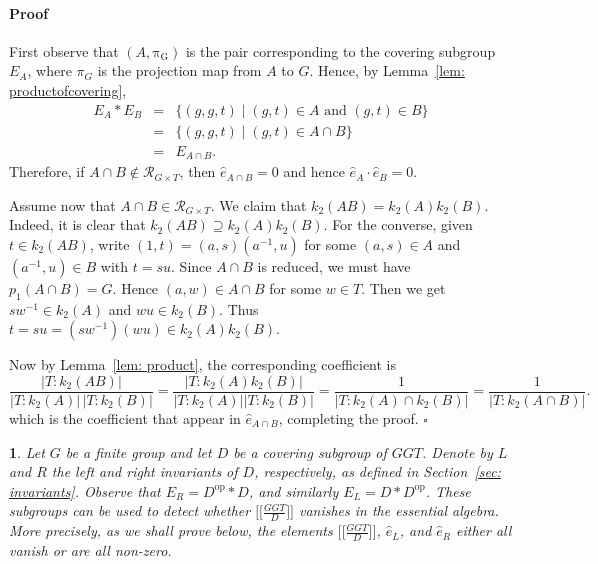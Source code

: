 \documentclass[12pt]{article}
\theoremstyle{change}
\newtheorem{nothing}[theorem]{}
\newenvironment{proof}{\paragraph{Proof}}{\hfill$\square$}
\newcommand{\calR}{\mathcal{R}}
\newcommand{\1}{{\bf 1}}
\begin{document}
\begin{proof}
First observe that \((A,\mathrm{\pi_G})\) is the pair corresponding to the covering subgroup \(E_A\), where $\pi_G$ is the projection map from $A$ to $G$. Hence, by Lemma~\ref{lem: productofcovering},
\begin{eqnarray*}
E_A*E_B
&=&
\{(g,g,t)\mid (g,t)\in A \text{ and } (g,t)\in B\} \\
&=&
\{(g,g,t)\mid (g,t)\in A\cap B\} \\
&=&
E_{A\cap B}.
\end{eqnarray*}
Therefore, if \(A\cap B \notin \calR_{G\times T}\), then
\(
\widehat{e}_{A\cap B}=0
\)
and hence
\(
\widehat{e}_A\cdot \widehat{e}_B=0.
\)

Assume now that \(A\cap B \in \calR_{G\times T}\). We claim that $k_2(AB) = k_2(A)k_2(B)$. Indeed, it is clear that $k_2(AB) \supseteq k_2(A)k_2(B)$. For the converse, given $t\in k_2(AB)$, write $(1, t) = (a, s)(a^{-1}, u)$ for some $(a, s)\in A$ and $(a^{-1}, u)\in B$ with $t= su$. Since $A\cap B$ is reduced, we must have $p_1(A\cap B) = G$. Hence $(a, w)\in A\cap B$ for some $w\in T$. Then we get $sw^{-1}\in k_2(A)$ and $wu\in k_2(B)$. Thus $t = su = (sw^{-1})(wu)\in k_2(A)k_2(B)$.

Now by Lemma~\ref{lem: product}, the corresponding coefficient is
$$
\frac{|T : k_2(AB)|}{|T : k_2(A)|\,|T : k_2(B)|} = \frac{|T:k_2(A)k_2(B)|}{|T:k_2(A)||T:k_2(B)|} = 
\frac{1}{|T:k_2(A)\cap k_2(B)|} = \frac{1}{|T:k_2(A\cap B)|}.
$$
which is the coefficient that appear in \(\widehat{e}_{A\cap B}\), completing the proof.
\end{proof}

\begin{nothing}
Let \(G\) be a finite group and let \(D\) be a covering subgroup of \(GGT\). Denote by \(L\) and \(R\) the left and right invariants of \(D\), respectively, as defined in Section~\ref{sec: invariants}. Observe that \(E_R=D^{\mathrm{op}}*D\), and similarly \(E_L=D*D^{\mathrm{op}}\). These subgroups can be used to detect whether \(\Big[\Big[\frac{GGT}{D}\Big]\Big]\) vanishes in the essential algebra. More precisely, as we shall prove below, the elements \(\Big[\Big[\frac{GGT}{D}\Big]\Big]\), \(\widehat{e}_L\), and \(\widehat{e}_R\) either all vanish or are all non-zero.
\end{nothing}
\end{document}
